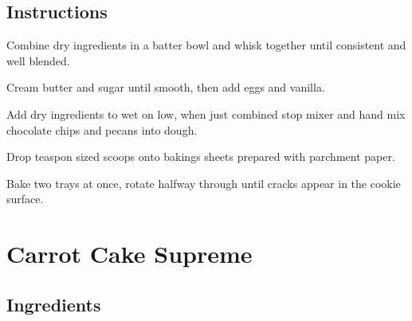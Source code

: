 \documentclass[ansiapaper,10pt,english]{sphinxmanual}
\begin{document}
\section{Instructions}
\label{\detokenize{chocolatechip_cookies:instructions}}
Combine dry ingredients in a batter bowl and whisk together until consistent and well blended.

Cream butter and sugar until smooth, then add eggs and vanilla.

Add dry ingredients to wet on low, when just combined stop mixer and hand mix chocolate chips and pecans into dough.

Drop teaspon sized scoops onto bakings sheets prepared with parchment paper.

Bake two trays at once, rotate halfway through until cracks appear in the cookie surface.


\chapter{Carrot Cake Supreme}
\label{\detokenize{carrotcake:carrot-cake-supreme}}\label{\detokenize{carrotcake::doc}}


\section{Ingredients}
\label{\detokenize{carrotcake:ingredients}}
%
\begin{sphinxVerbatim}[commandchars=\\\{\}]
     

   

  

  

   

  

  

  

  

    

   

   
\end{sphinxVerbatim}
\end{document}
